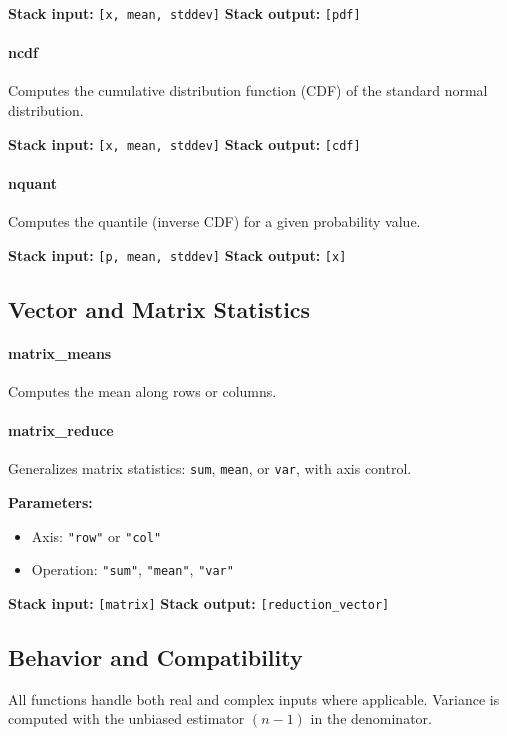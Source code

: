 \documentclass[12pt]{article}
\begin{document}
\textbf{Stack input:} \texttt{[x, mean, stddev]}  
\textbf{Stack output:} \texttt{[pdf]}

\paragraph{ncdf}
Computes the cumulative distribution function (CDF) of the standard normal distribution.

\textbf{Stack input:} \texttt{[x, mean, stddev]}  
\textbf{Stack output:} \texttt{[cdf]}

\paragraph{nquant}
Computes the quantile (inverse CDF) for a given probability value.

\textbf{Stack input:} \texttt{[p, mean, stddev]}  
\textbf{Stack output:} \texttt{[x]}

\subsection{Vector and Matrix Statistics}

\paragraph{matrix\_means}
Computes the mean along rows or columns.

\paragraph{matrix\_reduce}
Generalizes matrix statistics: \texttt{sum}, \texttt{mean}, or \texttt{var}, with axis control.

\textbf{Parameters:}
\begin{itemize}
  \item Axis: \texttt{"row"} or \texttt{"col"}
  \item Operation: \texttt{"sum"}, \texttt{"mean"}, \texttt{"var"}
\end{itemize}

\textbf{Stack input:} \texttt{[matrix]}  
\textbf{Stack output:} \texttt{[reduction\_vector]}

\subsection{Behavior and Compatibility}

All functions handle both real and complex inputs where applicable. Variance is computed with the unbiased estimator \((n - 1)\) in the denominator.
\end{document}
